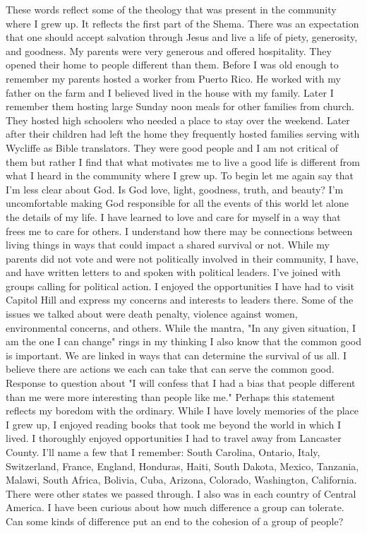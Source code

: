 These words reflect some of the theology that was present in the community where I grew up. It reflects the first part of the Shema. There was an expectation that one should accept salvation through Jesus and live a life of piety, generosity, and goodness. My parents were very generous and offered hospitality. They opened their home to people different than them. Before I was old enough to remember my parents hosted a worker from Puerto Rico. He worked with my father on the farm and I believed lived in the house with my family. Later I remember them hosting large Sunday noon meals for other families from church. They hosted high schoolers who needed a place to stay over the weekend. Later after their children had left the home they frequently hosted families serving with Wycliffe as Bible translators. They were good people and I am not critical of them but rather I find that what motivates me to live a good life is different from what I heard in the community where I grew up. 
To begin let me again say that I'm less clear about God. Is God love, light, goodness, truth, and beauty? I'm uncomfortable making God responsible for all the events of this world let alone the details of my life. I have learned to love and care for myself in a way that frees me to care for others. I understand how there may be connections between living things in ways that could impact a shared survival or not. 
While my parents did not vote and were not politically involved in their community, I have, and have written letters to and spoken with political leaders. I've joined with groups calling for political action. I enjoyed the opportunities I have had to visit Capitol Hill and express my concerns and interests to leaders there. Some of the issues we talked about were death penalty, violence against women, environmental concerns, and others. 
While the mantra, "In any given situation, I am the one I can change" rings in my thinking I also know that the common good is important. We are linked in ways that can determine the survival of us all. I believe there are actions we each can take that can serve the common good.
Response to question about "I will confess that I had a bias that people different than me were more interesting than people like me." Perhaps this statement reflects my boredom with the ordinary. While I have lovely memories of the place I grew up, I enjoyed reading books that took me beyond the world in which I lived. I thoroughly enjoyed opportunities I had to travel away from Lancaster County. I'll name a few that I remember: South Carolina, Ontario, Italy, Switzerland, France, England, Honduras, Haiti, South Dakota, Mexico, Tanzania, Malawi, South Africa, Bolivia, Cuba, Arizona, Colorado, Washington, California. There were other states we passed through. I also was in each country of Central America. 
I have been curious about how much difference a group can tolerate. Can some kinds of difference put an end to the cohesion of a group of people?






